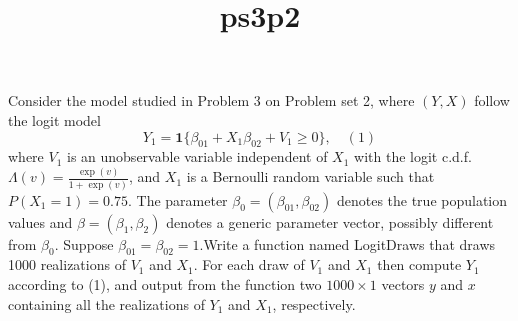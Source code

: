 \documentclass[11pt]{article}
\title{ps3p2}
\begin{document}
    
    \maketitle
    
    

    
    Consider the model studied in Problem 3 on Problem set 2, where
\((Y, X)\) follow the logit
model\[Y_1 = \mathbf{1}\{\beta_{01} + X_1\beta_{02} + V_1 \geq 0\}, \quad (1)\]where
\(V_1\) is an unobservable variable independent of \(X_1\) with the
logit c.d.f. \(\Lambda(v) = \frac{\exp(v)}{1+\exp(v)}\), and \(X_1\) is
a Bernoulli random variable such that \(P(X_1 = 1) = 0.75\). The
parameter \(\beta_0 = (\beta_{01}, \beta_{02})\) denotes the true
population values and \(\beta = (\beta_1, \beta_2)\) denotes a generic
parameter vector, possibly different from \(\beta_0\). Suppose
\(\beta_{01} = \beta_{02} = 1\).Write a function named LogitDraws that
draws 1000 realizations of \(V_1\) and \(X_1\). For each draw of \(V_1\)
and \(X_1\) then compute \(Y_1\) according to (1), and output from the
function two \(1000 \times 1\) vectors \(y\) and \(x\) containing all
the realizations of \(Y_1\) and \(X_1\), respectively.
\end{document}
